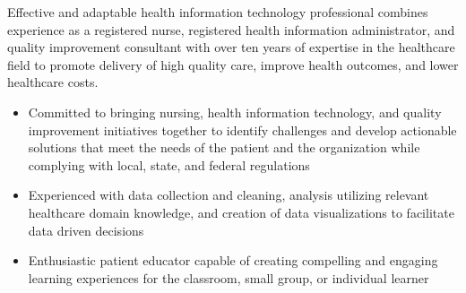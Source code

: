 

\begin{cvparagraph}

Effective and adaptable health information technology professional combines experience as a registered nurse, registered health information administrator, and quality improvement consultant with over ten years of expertise in the healthcare field to promote delivery of high quality care, improve health outcomes, and lower healthcare costs.
    \begin{itemize}[topsep=0pt,itemsep=0pt,parsep=0pt,partopsep=0pt,leftmargin=4mm]
      \item Committed to bringing nursing, health information technology, and quality improvement initiatives together to identify challenges and develop actionable solutions that meet the needs of the patient and the organization while complying with local, state, and federal regulations
      \item Experienced with data collection and cleaning, analysis utilizing relevant healthcare domain knowledge, and creation of data visualizations to facilitate data driven decisions
      \item Enthusiastic patient educator capable of creating compelling and engaging learning experiences for the classroom, small group, or individual learner
    \end{itemize}
\end{cvparagraph}

